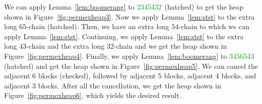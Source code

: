 \begin{example}
    We can apply Lemma~\ref{lem:boomerang} to $\textcolor{ggreen}{2345432}$ (hatched) to get the heap shown in Figure~\ref{fig:permexheap3}.
    Now we apply Lemma~\ref{lem:stst} to the extra long $65$-chain (hatched). Then, we have an extra long $54$-chain to which we can apply Lemma~\ref{lem:stst}.
    Continuing, we apply Lemma~\ref{lem:stst} to the extra long $43$-chain and the extra long $32$-chain and we get the heap shown in Figure~\ref{fig:permexheap4}.
    Finally, we apply Lemma~\ref{lem:boomerang} to $\textcolor{ggreen}{3456543}$ (hatched) and get the heap shown in Figure~\ref{fig:permexheap5}.
    We can cancel the adjacent 6 blocks (checked), followed by adjacent 5 blocks, adjacent 4 blocks, and adjacent 3 blocks. After all the cancellation, we get the heap shown in Figure~\ref{fig:permexheap6}, which yields the desired result.
\end{example}


